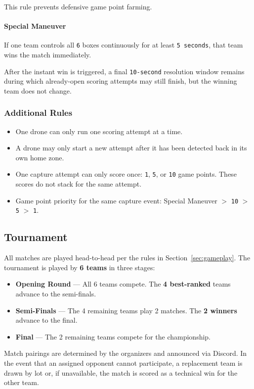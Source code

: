 This rule prevents defensive game point farming.

\paragraph{Special Maneuver}
If one team controls all \texttt{6} boxes continuously for at least \texttt{5 seconds}, that team wins the match immediately.

After the instant win is triggered, a final \texttt{10-second} resolution window remains during which already-open scoring attempts may still finish, but the winning team does not change.

\subsubsection{Additional Rules}
\begin{itemize}
	\item{One drone can only run one scoring attempt at a time.}
	\item{A drone may only start a new attempt after it has been detected back in its own home zone.}
	\item{One capture attempt can only score once: \texttt{1}, \texttt{5}, or \texttt{10} game points. These scores do not stack for the same attempt.}
	\item{Game point priority for the same capture event: Special Maneuver $>$ \texttt{10} $>$ \texttt{5} $>$ \texttt{1}.}
\end{itemize}
\subsection{Tournament}
All matches are played head-to-head per the rules in Section~\ref{sec:gameplay}. The tournament is played by \textbf{6 teams} in three stages:
\begin{itemize}
	\item{\textbf{Opening Round} --- All 6 teams compete. The \textbf{4 best-ranked} teams advance to the semi-finals.}
	\item{\textbf{Semi-Finals} --- The 4 remaining teams play 2 matches. The \textbf{2 winners} advance to the final.}
	\item{\textbf{Final} --- The 2 remaining teams compete for the championship.}
\end{itemize}
Match pairings are determined by the organizers and announced via Discord. In the event that an assigned opponent cannot participate, a replacement team is drawn by lot or, if unavailable, the match is scored as a technical win for the other team.

